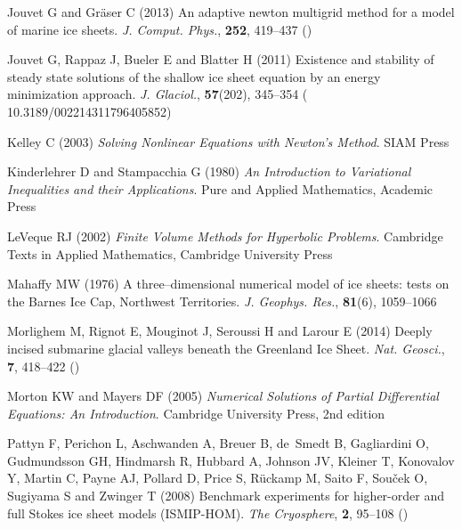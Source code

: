 \documentclass[review,letterpaper]{igs}
\begin{document}
\begin{thebibliography}{42}
Jouvet G and Gr{\"a}ser C (2013) An adaptive newton multigrid method for a
  model of marine ice sheets. \emph{J. Comput. Phys.}, \textbf{252}, 419--437
  ()

Jouvet G, Rappaz J, Bueler E and Blatter H (2011) Existence and stability of
  steady state solutions of the shallow ice sheet equation by an energy
  minimization approach. \emph{J. Glaciol.}, \textbf{57}(202), 345--354 (\doi
  {10.3189/002214311796405852})

Kelley C (2003) \emph{Solving {N}onlinear {E}quations with {N}ewton's
  {M}ethod}. SIAM Press

Kinderlehrer D and Stampacchia G (1980) \emph{An {I}ntroduction to
  {V}ariational {I}nequalities and their {A}pplications}. Pure and Applied
  Mathematics, Academic Press

LeVeque RJ (2002) \emph{Finite Volume Methods for Hyperbolic Problems}.
  Cambridge Texts in Applied Mathematics, Cambridge University Press

Mahaffy MW (1976) A three--dimensional numerical model of ice sheets: tests on
  the {B}arnes {I}ce {C}ap, {N}orthwest {T}erritories. \emph{J. Geophys. Res.},
  \textbf{81}(6), 1059--1066

Morlighem M, Rignot E, Mouginot J, Seroussi H and Larour E (2014) Deeply
  incised submarine glacial valleys beneath the {Greenland Ice Sheet}.
  \emph{Nat. Geosci.}, \textbf{7}, 418--422 ()

Morton KW and Mayers DF (2005) \emph{Numerical {S}olutions of {P}artial
  {D}ifferential {E}quations: {A}n {I}ntroduction}. Cambridge University Press,
  2nd edition

Pattyn F, Perichon L, Aschwanden A, Breuer B, de~Smedt B, Gagliardini O,
  Gudmundsson GH, Hindmarsh R, Hubbard A, Johnson JV, Kleiner T, Konovalov Y,
  Martin C, Payne AJ, Pollard D, Price S, R\"uckamp M, Saito F, Sou\v{c}ek O,
  Sugiyama S and Zwinger T (2008) Benchmark experiments for higher-order and
  full {S}tokes ice sheet models ({ISMIP-HOM}). \emph{The Cryosphere},
  \textbf{2}, 95--108 ()


\end{thebibliography}
\end{document}
